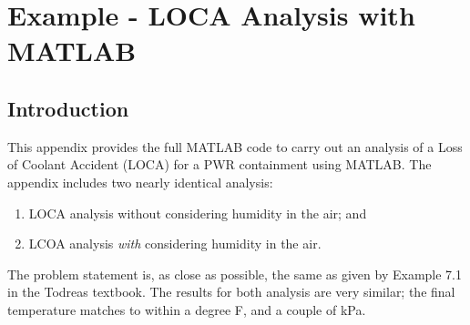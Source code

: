 \chapter{Example - LOCA Analysis with MATLAB}
\label{app:LOCA_ex}
\section{Introduction}

This appendix provides the full MATLAB code to carry out an analysis of a Loss of Coolant Accident (LOCA) for a PWR containment using MATLAB.  The appendix includes two nearly identical analysis:
\begin{enumerate}
\item LOCA analysis without considering humidity in the air; and
\item LCOA analysis \emph{with} considering humidity in the air.
\end{enumerate}

The problem statement is, as close as possible, the same as given by Example 7.1 in the Todreas textbook.  The results for both analysis are very similar; the final temperature matches to within a degree F, and a couple of kPa.

